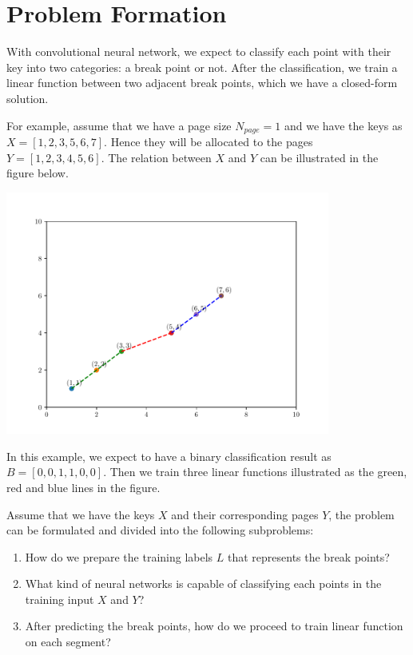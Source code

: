 \section{Problem Formation}

With convolutional neural network, we expect to classify each point with their key into two categories: a break point or not. After the classification, we train a linear function between two adjacent break points, which we have a closed-form solution.

\begin{mscexample}
	For example, assume that we have a page size $N_{page}=1$ and we have the keys as $X=[1,2,3,5,6,7]$. Hence they will be allocated to the pages $Y=[1,2,3,4,5,6]$. The relation between $X$ and $Y$ can be illustrated in the figure below.
	
	\begin{center}
		\includegraphics[width=0.8\textwidth]{graphs/conv/points_examples}
		\label{fig:conv_points}
	\end{center}
	
	In this example, we expect to have a binary classification result as $B=[0,0,1,1,0,0]$. Then we train three linear functions illustrated as the green, red and blue lines in the figure.
\end{mscexample} 

Assume that we have the keys $X$ and their corresponding pages $Y$, the problem can be formulated and divided into the following subproblems:

\begin{enumerate}
	\item How do we prepare the training labels $L$ that represents the break points?
	\item What kind of neural networks is capable of classifying each points in the training input $X$ and $Y$?
	\item After predicting the break points, how do we proceed to train linear function on each segment? 
\end{enumerate}

